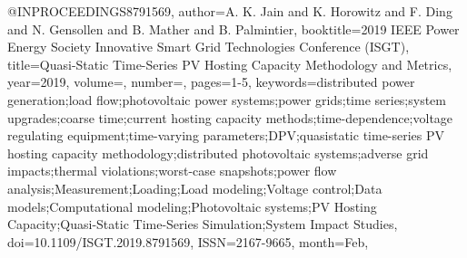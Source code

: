 @INPROCEEDINGS{8791569, 
author={A. K. {Jain} and K. {Horowitz} and F. {Ding} and N. {Gensollen} and B. {Mather} and B. {Palmintier}}, 
booktitle={2019 IEEE Power Energy Society Innovative Smart Grid Technologies Conference (ISGT)}, 
title={Quasi-Static Time-Series PV Hosting Capacity Methodology and Metrics}, 
year={2019}, 
volume={}, 
number={}, 
pages={1-5}, 
keywords={distributed power generation;load flow;photovoltaic power systems;power grids;time series;system upgrades;coarse time;current hosting capacity methods;time-dependence;voltage regulating equipment;time-varying parameters;DPV;quasistatic time-series PV hosting capacity methodology;distributed photovoltaic systems;adverse grid impacts;thermal violations;worst-case snapshots;power flow analysis;Measurement;Loading;Load modeling;Voltage control;Data models;Computational modeling;Photovoltaic systems;PV Hosting Capacity;Quasi-Static Time-Series Simulation;System Impact Studies}, 
doi={10.1109/ISGT.2019.8791569}, 
ISSN={2167-9665}, 
month={Feb},}
